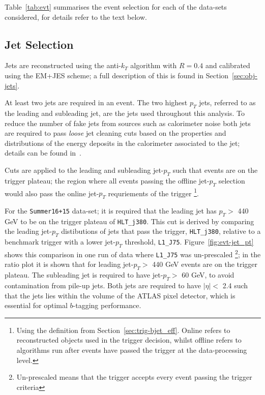 Table~\ref{tab:evt} summarises the event selection for each of the
data-sets considered, for details refer to the text below.

\subsection{Jet Selection}
\label{sec:evt-sel-jets}

Jets are reconstructed using the anti-$k_T$ algorithm with $R=0.4$
and calibrated using the EM+JES scheme;
a full description of this is found in Section~\ref{sec:obj-jets}.

At least two jets are required in an event.
The two highest $p_T$ jets, referred to as the leading and subleading jet,
are the jets used throughout this analysis.
To reduce the number of fake jets from sources such as calorimeter noise
both jets are required to pass \textit{loose} jet cleaning cuts
based on the properties and distributions of the energy deposits in the calorimeter associated to the jet;
details can be found in~\cite{evt-jet_cleaning}.

Cuts are applied to the leading and subleading jet-$p_T$ such that events are on the trigger plateau;
the region where all events passing the offline jet-$p_T$ selection
would also pass the online jet-$p_T$ requriements of the trigger
\footnote{Using the definition from Section~\ref{sec:trig-bjet_eff}. Online refers to reconstructed objects used in the trigger decision,
  whilst offline refers to algorithms run after events have passed the trigger at the data-processing level. }.

For the \verb|Summer16+15| data-set; it is required that the leading jet has $p_T >$ 440 GeV to be on the trigger plateau of \verb|HLT_j380|.
This cut is derived by comparing the leading jet-$p_T$ distibutions of jets that pass the trigger, \verb|HLT_j380|,
relative to a benchmark trigger with a lower jet-$p_T$ threshold, \verb|L1_J75|.
Figure~\ref{fig:evt-jet_pt} shows this comparison in one run of data where \verb|L1_J75| was un-prescaled
\footnote{Un-prescaled means that the trigger accepts every event passing the trigger criteria};
in the ratio plot it is shown that for leading jet-$p_T >$ 440 GeV events are on the trigger plateau.
The subleading jet is required to have jet-$p_T >$ 60 GeV,
to avoid contamination from pile-up jets.
Both jets  are required to have $|\eta| <$ 2.4
such that the jets lies within the volume of the ATLAS pixel detector,
which is essential for optimal $b$-tagging performance.

